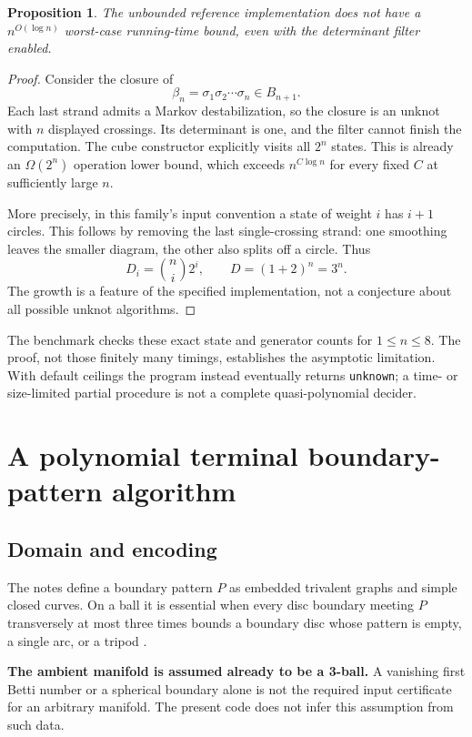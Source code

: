 \documentclass[11pt]{article}
\newtheorem{proposition}[theorem]{Proposition}
\theoremstyle{remark}\newtheorem{remark}[theorem]{Remark}
\newcommand{\code}[1]{\texttt{#1}}
\newcommand{\complexity}{n^{O(\log n)}}
\begin{document}
\begin{proposition}\label{prop:lower}
The unbounded reference implementation does not have a $\complexity$
worst-case running-time bound, even with the determinant filter enabled.
\end{proposition}
\begin{proof}
Consider the closure of
\[
 \beta_n=\sigma_1\sigma_2\cdots\sigma_n\in B_{n+1}.
\]
Each last strand admits a Markov destabilization, so the closure is an unknot
with $n$ displayed crossings. Its determinant is one, and the filter cannot
finish the computation. The cube constructor explicitly visits all $2^n$
states. This is already an $\Omega(2^n)$ operation lower bound, which exceeds
$n^{C\log n}$ for every fixed $C$ at sufficiently large $n$.

More precisely, in this family's input convention a state of weight $i$ has
$i+1$ circles. This follows by removing the last single-crossing strand: one
smoothing leaves the smaller diagram, the other also splits off a circle.
Thus
\[
 D_i=\binom ni2^i,\qquad D=(1+2)^n=3^n.
\]
The growth is a feature of the specified implementation, not a conjecture about
all possible unknot algorithms.
\end{proof}

The benchmark checks these exact state and generator counts for $1\leq n\leq8$.
The proof, not those finitely many timings, establishes the asymptotic
limitation. With default ceilings the program instead eventually returns
\code{unknown}; a time- or size-limited partial procedure is not a complete
quasi-polynomial decider.

\section{A polynomial terminal boundary-pattern algorithm}
\label{sec:pattern}

\subsection{Domain and encoding}
The notes define a boundary pattern $P$ as embedded trivalent graphs and simple
closed curves. On a ball it is essential when every disc boundary meeting $P$
transversely at most three times bounds a boundary disc whose pattern is empty,
a single arc, or a tripod \cite[pp.~24--25]{notes}.

\textbf{The ambient manifold is assumed already to be a 3-ball.} A vanishing
first Betti number or a spherical boundary alone is not the required input
certificate for an arbitrary manifold. The present code does not infer this
assumption from such data.
\end{document}

